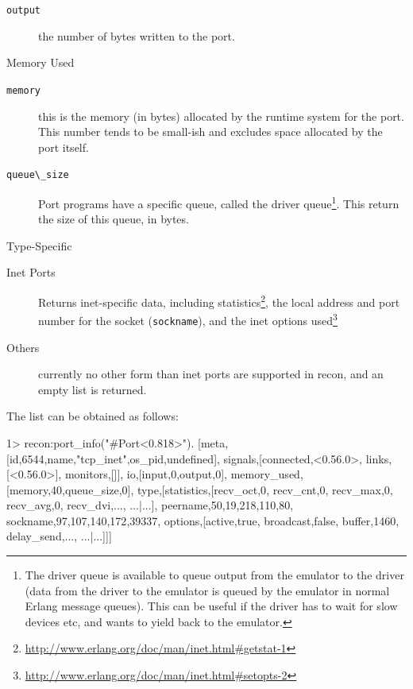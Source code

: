 \documentclass[11pt, oneside]{book}   	%
\newcommand{\expression}[1]{\Verb`#1`}
\begin{document}
\begin{description*}
\begin{description}
			\item[\expression{output}] the number of bytes written to the port.
		\end{description}

	\item[Memory Used] \hfill
		\begin{description}		
			\item[\expression{memory}] this is the memory (in bytes) allocated by the runtime system for the port. This number tends to be small-ish and excludes space allocated by the port itself.
			
			\item[\expression{queue\_size}] Port programs have a specific queue, called the driver queue\footnote{The driver queue is available to queue output from the emulator to the driver (data from the driver to the emulator is queued by the emulator in normal Erlang message queues). This can be useful if the driver has to wait for slow devices etc, and wants to yield back to the emulator.}. This return the size of this queue, in bytes.
		\end{description}
		
	\item[Type-Specific] \hfill
		\begin{description}		
			\item[Inet Ports] Returns inet-specific data, including statistics\footnote{\href{http://www.erlang.org/doc/man/inet.html\#getstat-1}{http://www.erlang.org/doc/man/inet.html\#getstat-1}}, the local address and port number for the socket (\expression{sockname}), and the inet options used\footnote{\href{http://www.erlang.org/doc/man/inet.html\#setopts-2}{http://www.erlang.org/doc/man/inet.html\#setopts-2}}
			\item[Others] currently no other form than inet ports are supported in recon, and an empty list is returned.
		\end{description}
\end{description*}
		
The list can be obtained as follows:

\begin{VerbatimEshell}
1> recon:port_info("#Port<0.818>").
[{meta,[{id,6544},{name,"tcp_inet"},{os_pid,undefined}]},
 {signals,[{connected,<0.56.0>},
           {links,[<0.56.0>]},
           {monitors,[]}]},
 {io,[{input,0},{output,0}]},
 {memory_used,[{memory,40},{queue_size,0}]},
 {type,[{statistics,[{recv_oct,0},
                     {recv_cnt,0},
                     {recv_max,0},
                     {recv_avg,0},
                     {recv_dvi,...},
                     {...}|...]},
        {peername,{{50,19,218,110},80}},
        {sockname,{{97,107,140,172},39337}},
        {options,[{active,true},
                  {broadcast,false},
                  {buffer,1460},
                  {delay_send,...},
                  {...}|...]}]}]
\end{VerbatimEshell}
		
\end{document}
